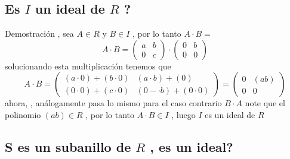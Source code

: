 \documentclass[10pt,a4paper]{article} %
\begin{document}
        \subsection{Es $ I  $ un ideal de $ R  $  ?}
            Demostración , sea $ A \in R  $  y $ B \in I  $  , por lo tanto $ A
            \cdot B  =  $
            \begin{equation}
                A \cdot  B = \begin{pmatrix}
                    a & b
                    \\
                    0 & c
                \end{pmatrix}
                \cdot
                \begin{pmatrix}
                    0 & b
                    \\
                    0 & 0
                \end{pmatrix}
            \end{equation}
            solucionando esta multiplicación tenemos que
            \begin{equation}
                A \cdot B = \begin{pmatrix}
                    (a \cdot 0) + (b \cdot 0) & (a \cdot b )+ (0 )
                    \\
                    (0 \cdot 0)+(c \cdot 0) & (0- \cdot b) + (0 \cdot 0)
                \end{pmatrix} =
                \begin{pmatrix}
                    0 & ( ab)
                    \\
                    0 & 0
                \end{pmatrix}
            \end{equation}
            ahora, , análogamente pasa lo mismo para el caso  contrario $ B \cdot A  $
            note que el polinomio $ ( ab)  \in R $ , por lo tanto $ A \cdot B \in I
            $ , luego $ I  $ es un ideal de $ R  $

        \subsection{S es un subanillo de $ R  $   , es un ideal?}
\end{document}

